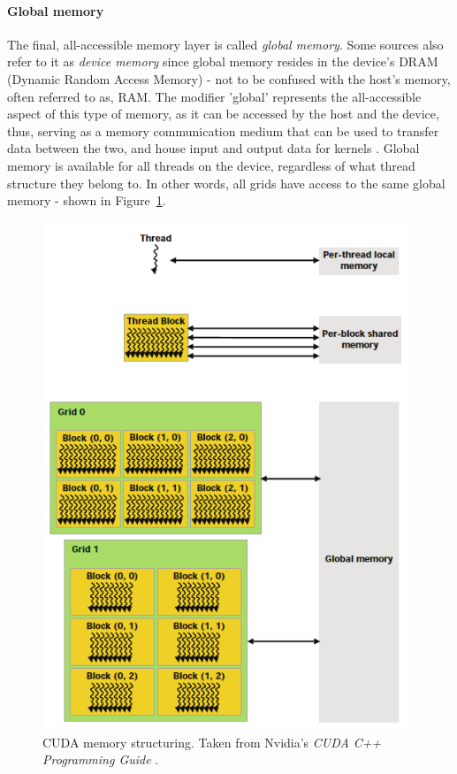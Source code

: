 \paragraph{Global memory}\label{Paragraph:CUDA-memory-management-global-memory}
The final, all-accessible memory layer is called \textit{global memory}. Some sources also refer to it as \textit{device memory} since global memory resides in the device's DRAM (Dynamic Random Access Memory) - not to be confused with the host's memory, often referred to as, RAM. The modifier 'global' represents the all-accessible aspect of this type of memory, as it can be accessed by the host and the device, thus, serving as a memory communication medium that can be used to transfer data between the two, and house input and output data for kernels \cite{Harris7January2013}. Global memory is available for all threads on the device, regardless of what thread structure they belong to. In other words, all grids have access to the same global memory - shown in Figure~\ref{Figure:CUDA-memory-management}.

\begin{figure}[h!]
	\centering
	\includegraphics[width=11cm, keepaspectratio]{images/ch1/CUDA_memory_management.png}
	\caption{CUDA memory structuring. Taken from Nvidia's \emph{CUDA C++ Programming Guide} \cite{NVIDIAMay2022}.}
	\label{Figure:CUDA-memory-management}
\end{figure}

